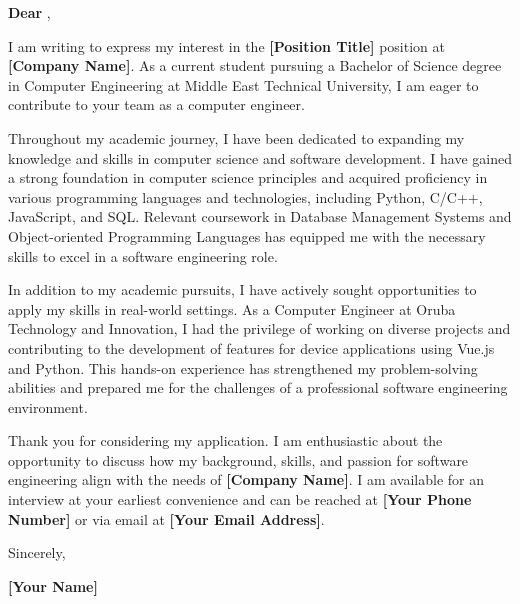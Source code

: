 \documentclass{article}
\begin{document}
\begin{center}
    \textbf{Dear \HiringManager},
\end{center}

I am writing to express my interest in the \textbf{[Position Title]} position at \textbf{[Company Name]}. As a current student pursuing a Bachelor of Science degree in Computer Engineering at Middle East Technical University, I am eager to contribute to your team as a computer engineer.

Throughout my academic journey, I have been dedicated to expanding my knowledge and skills in computer science and software development. I have gained a strong foundation in computer science principles and acquired proficiency in various programming languages and technologies, including Python, C/C++, JavaScript, and SQL. Relevant coursework in Database Management Systems and Object-oriented Programming Languages has equipped me with the necessary skills to excel in a software engineering role.

In addition to my academic pursuits, I have actively sought opportunities to apply my skills in real-world settings. As a Computer Engineer at Oruba Technology and Innovation, I had the privilege of working on diverse projects and contributing to the development of features for device applications using Vue.js and Python. This hands-on experience has strengthened my problem-solving abilities and prepared me for the challenges of a professional software engineering environment.

Thank you for considering my application. I am enthusiastic about the opportunity to discuss how my background, skills, and passion for software engineering align with the needs of \textbf{[Company Name]}. I am available for an interview at your earliest convenience and can be reached at \textbf{[Your Phone Number]} or via email at \textbf{[Your Email Address]}.

Sincerely,

\textbf{[Your Name]}
\end{document}
